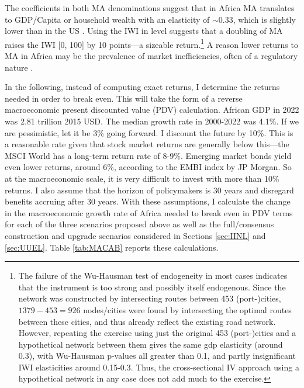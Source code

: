 \documentclass[a4paper]{article}
\begin{document}
The coefficients in both MA denominations suggest that in Africa MA translates to GDP/Capita or household wealth with an elasticity of $\sim$0.33, which is slightly lower than in the US \citep{donaldson2016railroads}. Using the IWI in level suggests that a doubling of MA raises the IWI [0, 100] by 10 points---a sizeable return.\footnote{The failure of the Wu-Hausman test of endogeneity in most cases indicates that the instrument is too strong and possibly itself endogenous. Since the network was constructed by intersecting routes between 453 (port-)cities, $1379-453 = 926$ nodes/cities were found by intersecting the optimal routes between these cities, and thus already reflect the existing road network. However, repeating the exercise using just the original 453 (port-)cities and a hypothetical network between them gives the same gdp elasticity (around 0.3), with Wu-Hausman p-values all greater than 0.1, and partly insignificant IWI elasticities around 0.15-0.3. Thus, the cross-sectional IV approach using a hypothetical network in any case does not add much to the exercise.} %
A reason lower returns to MA in Africa may be the prevalence of market inefficiencies, often of a regulatory nature \citep{herrera2024shrinking}. %

In the following, instead of computing exact returns, I determine the returns needed in order to break even. This will take the form of a reverse macroeconomic present discounted value (PDV) calculation. African GDP in 2022 was 2.81 trillion 2015 USD. The median growth rate in 2000-2022 was 4.1\%. If we are pessimistic, let it be 3\% going forward. I discount the future by 10\%. This is a reasonable rate given that stock market returns are generally below this---the MSCI World has a long-term return rate of 8-9\%. Emerging market bonds yield even lower returns, around 6\%, according to the EMBI index by JP Morgan. So at the macroeconomic scale, it is very difficult to invest with more than 10\% returns. I also assume that the horizon of policymakers is 30 years and disregard benefits accruing after 30 years. With these assumptions, I calculate the change in the macroeconomic growth rate of Africa needed to break even in PDV terms for each of the three scenarios proposed above as well as the full/consensus construction and upgrade scenarios considered in Sections \ref{sec:IINL} and \ref{sec:UUEL}. Table \ref{tab:MACAB} reports these calculations.
\end{document}
